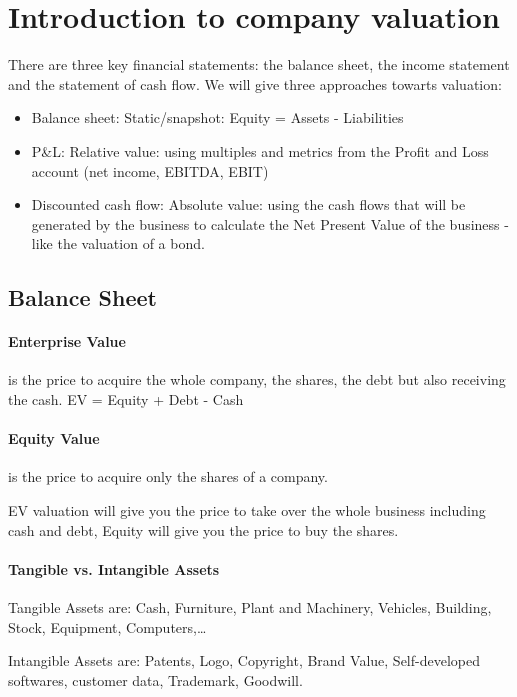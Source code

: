 \section{Introduction to company valuation}

There are three key financial statements: the balance sheet, the income statement
and the statement of cash flow. We will give three approaches towarts valuation:
\begin{itemize}
    \item Balance sheet: Static/snapshot: Equity = Assets - Liabilities
    \item P\&L: Relative value: using multiples and metrics from the Profit and
        Loss account (net income, EBITDA, EBIT)
    \item Discounted cash flow: Absolute value: using the cash flows that will be
        generated by the business to calculate the Net Present Value of the business
        - like the valuation of a bond.
\end{itemize}

\subsection{Balance Sheet}

\paragraph{Enterprise Value}
is the price to acquire the whole company, the shares, the debt but also
receiving the cash. EV = Equity + Debt - Cash

\paragraph{Equity Value}
is the price to acquire only the shares of a company.

\vspace{1\baselineskip}

EV valuation will give you the price to take over the whole business including cash
and debt, Equity will give you the price to buy the shares.

\paragraph{Tangible vs. Intangible Assets}
Tangible Assets are: Cash, Furniture, Plant and Machinery, Vehicles,
Building, Stock, Equipment, Computers,\dots

Intangible Assets are: Patents, Logo, Copyright, Brand Value, Self-developed
softwares, customer data, Trademark, Goodwill.


